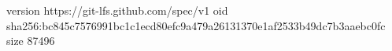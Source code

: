 version https://git-lfs.github.com/spec/v1
oid sha256:bc845c7576991bc1c1ecd80efc9a479a26131370e1af2533b49dc7b3aaebc0fc
size 87496
